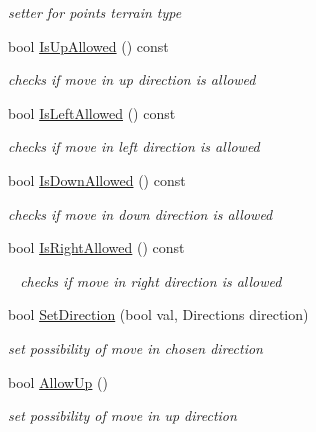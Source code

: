 \begin{DoxyCompactItemize}
\begin{DoxyCompactList}\small\item\em setter for point\textquotesingle{}s terrain type \end{DoxyCompactList}\item 
bool \mbox{\hyperlink{class_point_af43939ed444048c105909fe20ec9d7a1}{Is\+Up\+Allowed}} () const
\begin{DoxyCompactList}\small\item\em checks if move in up direction is allowed \end{DoxyCompactList}\item 
bool \mbox{\hyperlink{class_point_a49b95773802999e73b390df343cc780e}{Is\+Left\+Allowed}} () const
\begin{DoxyCompactList}\small\item\em checks if move in left direction is allowed \end{DoxyCompactList}\item 
bool \mbox{\hyperlink{class_point_aa686595d33470ea204428326128aebc3}{Is\+Down\+Allowed}} () const
\begin{DoxyCompactList}\small\item\em checks if move in down direction is allowed \end{DoxyCompactList}\item 
\mbox{\label{class_point_a0882d6fc2b88e340ecc5beb71f6930dd}} 
bool \mbox{\hyperlink{class_point_a0882d6fc2b88e340ecc5beb71f6930dd}{Is\+Right\+Allowed}} () const
\begin{DoxyCompactList}\small\item\em ~\newline
checks if move in right direction is allowed \end{DoxyCompactList}\item 
bool \mbox{\hyperlink{class_point_a30fe455d593e1f5e049bd80e374045a4}{Set\+Direction}} (bool val, Directions direction)
\begin{DoxyCompactList}\small\item\em set possibility of move in chosen direction \end{DoxyCompactList}\item 
bool \mbox{\hyperlink{class_point_ae8e3d753aeaa848e2cc27d1a95f31646}{Allow\+Up}} ()
\begin{DoxyCompactList}\small\item\em set possibility of move in up direction \end{DoxyCompactList}\item 

\end{DoxyCompactItemize}
